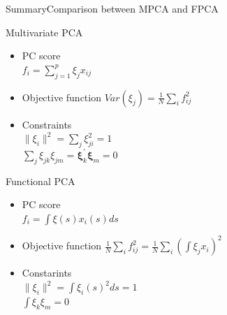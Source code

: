 \documentclass{beamer}
\begin{document}
\begin{frame}{Summary}{Comparison between MPCA and FPCA}
\begin{multicols}{2}
	Multivariate PCA
	\begin{itemize}
		\item {
			PC score\\
			$ f_i = \sum_{j=1}^p \xi_j x_{ij} $
		}
		\item {
			Objective function
			$ Var(\xi_j) = \frac{1}{N}\sum_i f_{ij}^2 $
		}
		\item {
			Constraints\\
			$ \lVert\xi_i\rVert^2= \sum_j \xi_{ji}^2 = 1 $\\
			$ \sum_j \xi_{jk}\xi_{jm}=\boldsymbol{\xi}_k^{'}\boldsymbol{\xi}_m=0 $
		}
	\end{itemize}
	
	Functional PCA
	\begin{itemize}
		\item {
			PC score\\
			$ f_i = \int \xi(s) x_i(s) ds $
		}
		\item {
			Objective function
			$ \frac{1}{N}\sum_i f_{ij}^2 = \frac{1}{N}\sum_i (\int \xi_j x_i)^2 $
		}
		\item {
			Constarints\\
			$ \lVert\xi_i\rVert^2=\int \xi_i(s)^2 ds = 1 $\\
			$ \int \xi_k\xi_m=0 $
		}
	\end{itemize}
\end{multicols}
\end{frame}


\end{document}

